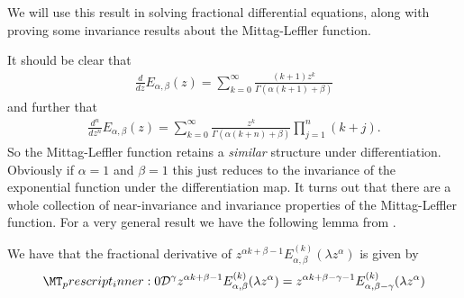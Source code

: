 We will use this result in solving fractional differential equations, along with proving some invariance results about the Mittag-Leffler function.

It should be clear that
\begin{align}
    \frac{d}{dz}E_{\alpha, \beta}(z) = \sum_{k=0}^\infty \frac{(k+1)z^k}{\Gamma(\alpha(k+1) + \beta)}
\end{align}
and further that
\begin{align}
    \label{eq:mit_int_der}
    \frac{d^n}{dz^n} E_{\alpha, \beta}(z) = \sum_{k=0}^\infty \frac{z^k}{\Gamma(\alpha(k+n)+\beta)}\prod_{j=1}^n(k+j).
\end{align}
So the Mittag-Leffler function retains a \emph{similar} structure under differentiation. Obviously if $ \alpha = 1 $ and $ \beta = 1 $ this just reduces to the invariance of the exponential function under the differentiation map. It turns out that there are a whole collection of near-invariance and invariance properties of the Mittag-Leffler function. For a very general result we have the following lemma from \cite{Podlubny1999}.
\begin{mdframed}[innertopmargin=10pt]
\begin{lemma}
    \label{lem:rld_mittag}
    We have that the fractional derivative of $ z^{\alpha k+\beta-1}E_{\alpha,\beta}^{(k)}(\lambda z^\alpha) $ is given by 
    \begin{align}
        \prescript{}{0}{\mathcal{D}}^\gamma z^{\alpha k+\beta-1}E_{\alpha,\beta}^{(k)}(\lambda z^\alpha) = z^{\alpha k + \beta - \gamma - 1 } E_{\alpha,\beta-\gamma}^{(k)}(\lambda z^\alpha)
    \end{align}
\end{lemma}
\end{mdframed}
